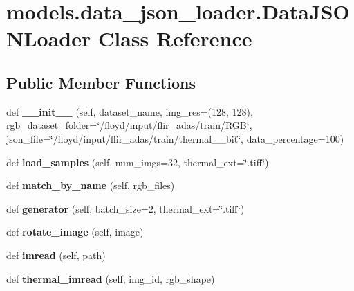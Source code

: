 \hypertarget{classmodels_1_1data__json__loader_1_1DataJSONLoader}{}\section{models.\+data\+\_\+json\+\_\+loader.\+Data\+J\+S\+O\+N\+Loader Class Reference}
\label{classmodels_1_1data__json__loader_1_1DataJSONLoader}
\subsection*{Public Member Functions}
\begin{DoxyCompactItemize}
\item 
\mbox{\label{classmodels_1_1data__json__loader_1_1DataJSONLoader_aaa8a939d0db2a1117c3620af08f2368f}} 
def {\bfseries \+\_\+\+\_\+init\+\_\+\+\_\+} (self, dataset\+\_\+name, img\+\_\+res=(128, 128), rgb\+\_\+dataset\+\_\+folder=\char`\"{}/floyd/input/flir\+\_\+adas/train/R\+GB\char`\"{}, json\+\_\+file=\char`\"{}/floyd/input/flir\+\_\+adas/train/thermal\+\_\+\_\+bit\char`\"{}, data\+\_\+percentage=100)
\item 
\mbox{\label{classmodels_1_1data__json__loader_1_1DataJSONLoader_a0939f8e14d269227cb7e44a2d1a4acc1}} 
def {\bfseries load\+\_\+samples} (self, num\+\_\+imgs=32, thermal\+\_\+ext=\char`\"{}.tiff\char`\"{})
\item 
\mbox{\label{classmodels_1_1data__json__loader_1_1DataJSONLoader_a491f215f6e503972ef415dd88270c324}} 
def {\bfseries match\+\_\+by\+\_\+name} (self, rgb\+\_\+files)
\item 
\mbox{\label{classmodels_1_1data__json__loader_1_1DataJSONLoader_adefc1aa06d66a0e3e6fddb1c75f007e7}} 
def {\bfseries generator} (self, batch\+\_\+size=2, thermal\+\_\+ext=\char`\"{}.tiff\char`\"{})
\item 
\mbox{\label{classmodels_1_1data__json__loader_1_1DataJSONLoader_a0ffd7300d6c57d45dfc1e23681b8d264}} 
def {\bfseries rotate\+\_\+image} (self, image)
\item 
\mbox{\label{classmodels_1_1data__json__loader_1_1DataJSONLoader_a6694201556c810977f8ed85a9b753fd7}} 
def {\bfseries imread} (self, path)
\item 
\mbox{\label{classmodels_1_1data__json__loader_1_1DataJSONLoader_a44c3ca334604ba0d19893385d2f993ab}} 
def {\bfseries thermal\+\_\+imread} (self, img\+\_\+id, rgb\+\_\+shape)
\end{DoxyCompactItemize}
